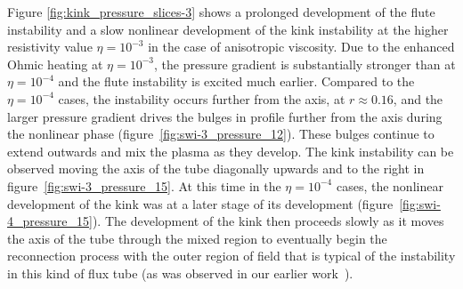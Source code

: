 \documentclass[fleqn,usenatbib]{mnras}
\newcommand{\rs}[2]{{#2}}
\begin{document}
\rs{Figures \ref{fig:kink_pressure_slices-3} show the}{Figure
  \ref{fig:kink_pressure_slices-3} shows a} prolonged 
development of the \rs{fluting}{flute} instability and \rs{the}{a} slow
nonlinear development of the kink \rs{}{instability at the higher
  resistivity value $\eta=10^{-3}$ in the case of anisotropic viscosity}. Due to the enhanced Ohmic heating 
\rs{when}{at} $\eta=10^{-3}$, the pressure gradient is substantially stronger
than \rs{when}{at} $\eta=10^{-4}$ and the \rs{fluting}{flute} instability is
excited much earlier. Compared to the $\eta=10^{-4}$ cases, the
instability occurs further from the axis, at $r\approx0.16$, and the
larger pressure gradient drives the bulges \rs{}{in profile} further
from the axis \rs{in}{during} the nonlinear phase
(figure~\ref{fig:swi-3_pressure_12}). These bulges continue to extend
outwards and mix the plasma as they develop. The kink instability can
be observed moving the axis of the tube diagonally upwards and to the
right in figure~\ref{fig:swi-3_pressure_15}. At this time in the
$\eta=10^{-4}$ cases, the nonlinear development of the kink was
\rs{further along}{at a later stage of its development} (figure~\ref{fig:swi-4_pressure_15}). The development of
the kink then proceeds slowly as it moves the axis of the tube through
the mixed region to eventually begin the reconnection process with the
outer region of field that is typical of the instability in this kind
of flux tube (as was observed in
\rs{chapter}{our earlier work}~\citep{quinnEffectAnisotropicViscosity2020}). 
\end{document}
